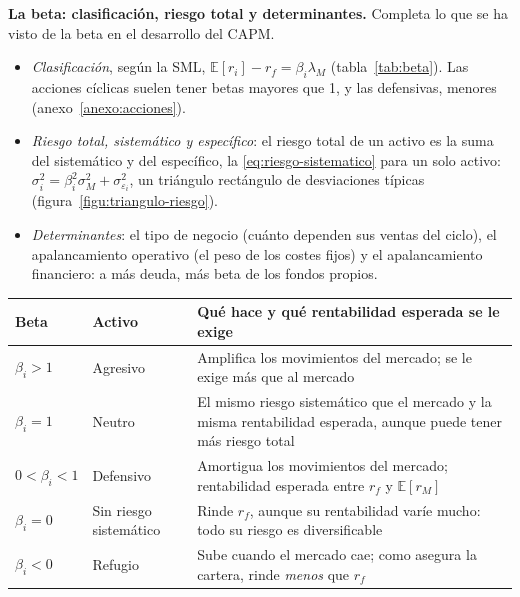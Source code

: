 \documentclass[11pt]{article}
\begin{document}
\begin{anotaciones}
\textbf{La beta: clasificación, riesgo total y determinantes.} Completa lo que se ha visto de la beta en el desarrollo del CAPM.
\begin{itemize}
\item \emph{Clasificación}, según la SML, $\mathbb{E}[r_i]-r_f=\beta_i\lambda_M$ (tabla~\ref{tab:beta}). Las acciones cíclicas suelen tener betas mayores que 1, y las defensivas, menores (anexo~\ref{anexo:acciones}).
\item \emph{Riesgo total, sistemático y específico}: el riesgo total de un activo es la suma del sistemático y del específico, la \eqref{eq:riesgo-sistematico} para un solo activo: $\sigma_i^2=\beta_i^2\sigma_M^2+\sigma_{\varepsilon_i}^2$, un triángulo rectángulo de desviaciones típicas (figura~\ref{figu:triangulo-riesgo}).
\item \emph{Determinantes}: el tipo de negocio (cuánto dependen sus ventas del ciclo), el apalancamiento operativo (el peso de los costes fijos) y el apalancamiento financiero: a más deuda, más beta de los fondos propios.
\end{itemize}
\begin{tablacaja}
\centering
\caption{Clasificación de los activos por su beta}\label{tab:beta}
\small
\begin{tabular}{>{\centering\arraybackslash}m{2.2cm}>{\centering\arraybackslash}m{2.4cm}>{\centering\arraybackslash}m{9.0cm}}
\toprule
\rowcolor{tceeazulpalido}\textbf{Beta} & \textbf{Activo} & \textbf{Qué hace y qué rentabilidad esperada se le exige}\\
\midrule
$\beta_i>1$ & \textcolor{tceerojo}{Agresivo} & Amplifica los movimientos del mercado; se le exige más que al mercado\\
\addlinespace[0.2em]
\cellcolor{tceesalvia}$\beta_i=1$ & \cellcolor{tceesalvia}Neutro & \cellcolor{tceesalvia}El mismo riesgo sistemático que el mercado y la misma rentabilidad esperada, aunque puede tener más riesgo total\\
\addlinespace[0.2em]
$0<\beta_i<1$ & \textcolor{tceeazul}{Defensivo} & Amortigua los movimientos del mercado; rentabilidad esperada entre $r_f$ y $\mathbb{E}[r_M]$\\
\addlinespace[0.2em]
$\beta_i=0$ & Sin riesgo sistemático & Rinde $r_f$, aunque su rentabilidad varíe mucho: todo su riesgo es diversificable\\
\addlinespace[0.2em]
$\beta_i<0$ & \textcolor{tceeverde}{Refugio} & Sube cuando el mercado cae; como asegura la cartera, rinde \emph{menos} que $r_f$\\

\end{tabular}
\end{tablacaja}
\end{anotaciones}
\end{document}
